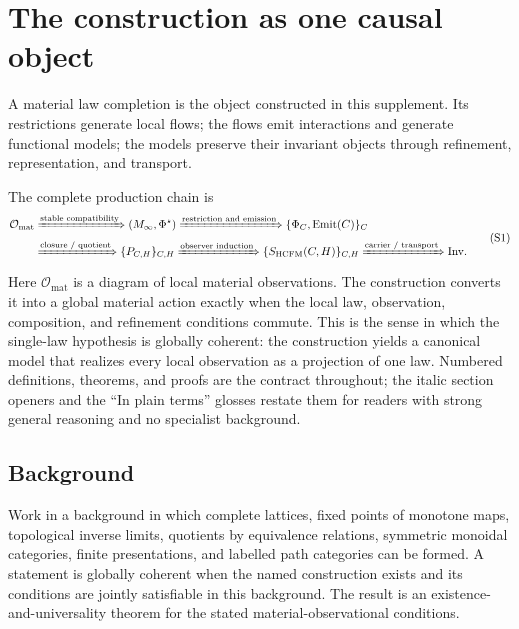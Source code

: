 \documentclass[11pt]{article}
\theoremstyle{definition}
\newcommand{\Omat}{\mathcal{O}_{\mathrm{mat}}}
\newcommand{\Minf}{M_\infty}
\begin{document}
\setcounter{theorem}{0}
\setcounter{definition}{0}
\setcounter{proposition}{0}
\setcounter{lemma}{0}
\setcounter{corollary}{0}
\setcounter{remark}{0}
\setcounter{conjecture}{0}
\setcounter{obligation}{0}

\tableofcontents

\section{The construction as one causal object}

A material law completion is the object constructed in this supplement. Its restrictions generate local flows; the flows emit interactions and generate functional models; the models preserve their invariant objects through refinement, representation, and transport.

The complete production chain is
\begin{equation}
\begin{aligned}
\Omat &\xRightarrow{\text{stable compatibility}} (\Minf, \Phi^{\star})
\xRightarrow{\text{restriction and emission}} \{\Phi_C, \mathrm{Emit}(C)\}_C\\
&\xRightarrow{\text{closure / quotient}} \{P_{C,H}\}_{C,H}
\xRightarrow{\text{observer induction}} \{S_{\mathrm{HCFM}}(C, H)\}_{C,H}
\xRightarrow{\text{carrier / transport}} \mathrm{Inv}.
\end{aligned}\tag{S1}
\end{equation}
Here $\Omat$ is a diagram of local material observations. The construction converts it into a global material action exactly when the local law, observation, composition, and refinement conditions commute. This is the sense in which the single-law hypothesis is globally coherent: the construction yields a canonical model that realizes every local observation as a projection of one law. Numbered definitions, theorems, and proofs are the contract throughout; the italic section openers and the ``In plain terms'' glosses restate them for readers with strong general reasoning and no specialist background.

\subsection{Background}

Work in a background in which complete lattices, fixed points of monotone maps, topological inverse limits, quotients by equivalence relations, symmetric monoidal categories, finite presentations, and labelled path categories can be formed. A statement is globally coherent when the named construction exists and its conditions are jointly satisfiable in this background. The result is an existence-and-universality theorem for the stated material-observational conditions.
\end{document}
